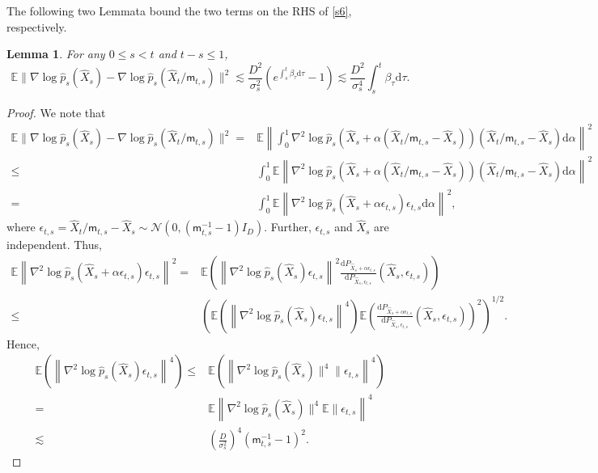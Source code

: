 \documentclass[12pts]{article}
\newtheorem{lemma}[defn]{Lemma}%
\newcommand{\diff}{\mathrm{d}}
\newcommand{\cN}{ \mathcal{N}}
\newcommand{\hX}{ \widehat{X}}
\newcommand{\E}{\mathbb{E}}
\newcommand{\hp}{\hat{p}}
\begin{document}
The following two Lemmata bound the two terms on the RHS of \eqref{s6}, respectively.
\begin{lemma}\label{lem:3}
    For any $0 \le s < t$ and $t-s \le 1$, \[\E \|\nabla \log \hp_s(\hX_s) - \nabla \log \hp_s(\hX_t/\mathsf{m}_{t,s})\|^2 \lesssim \frac{D^2}{\sigma_s^2} \left( e^{\int_s^t \beta_\tau \diff  \tau} - 1\right) \lesssim \frac{D^2}{\sigma_s^4} \int_s^t \beta_\tau \diff  \tau.\]
\end{lemma}
\begin{proof}
We note that 
\begingroup
\allowdisplaybreaks
\begin{align}
     \E \|\nabla \log \hp_s(\hX_s) - \nabla \log \hp_s(\hX_t/\mathsf{m}_{t,s})\|^2 = & \E \left\| \int_0^1 \nabla^2 \log \hp_s(\hX_s + \alpha (\hX_t/\mathsf{m}_{t,s} - \hX_s)) (\hX_t/\mathsf{m}_{t,s} - \hX_s) \diff  \alpha \right\|^2 \nonumber\\
    \le  & \int_0^1 \E \left\| \nabla^2 \log \hp_s(\hX_s + \alpha (\hX_t/\mathsf{m}_{t,s} - \hX_s)) (\hX_t/\mathsf{m}_{t,s} - \hX_s) \diff  \alpha \right\|^2 \nonumber\\
    = & \int_0^1 \E \left\| \nabla^2 \log \hp_s(\hX_s + \alpha \epsilon_{t,s}) \epsilon_{t,s} \diff  \alpha \right\|^2, \label{s5}
\end{align}
\endgroup
where $\epsilon_{t,s} = \hX_t/\mathsf{m}_{t,s} - \hX_s \sim \cN(0, (\mathsf{m}_{t,s}^{-1}-1)I_D)$. Further, $\epsilon_{t,s}$ and $\hX_s$ are independent. Thus,
\begin{align}
     \E \left\| \nabla^2 \log \hp_s(\hX_s + \alpha \epsilon_{t,s}) \epsilon_{t,s}  \right\|^2 
    = & \E \left(\left\| \nabla^2 \log \hp_s(\hX_s) \epsilon_{t,s} \right\|^2 \frac{\diff  P_{\hX_s + \alpha \epsilon_{t,s}}}{\diff  P_{\hX_s, \epsilon_{t,s}}}(\hX_s, \epsilon_{t,s}) \right) \nonumber\\
    \le & \left(\E \left(\left\| \nabla^2 \log \hp_s(\hX_s) \epsilon_{t,s} \right\|^4 \right) \E \left( \frac{\diff  P_{\hX_s + \alpha \epsilon_{t,s}}}{\diff  P_{\hX_s, \epsilon_{t,s}}}(\hX_s, \epsilon_{t,s}) \right)^2\right)^{1/2} . \label{s4}
\end{align}
Hence, 
\begin{align}
    \E \left(\left\| \nabla^2 \log \hp_s(\hX_s) \epsilon_{t,s} \right\|^4 \right) \le & \E \left(\left\| \nabla^2 \log \hp_s(\hX_s)\|^4 \|\epsilon_{t,s} \right\|^4 \right) \nonumber\\
    = & \E \left\| \nabla^2 \log \hp_s(\hX_s)\|^4 \E \|\epsilon_{t,s} \right\|^4 \nonumber\\
    \lesssim & \left(\frac{D}{\sigma_s^2}\right)^4 (\mathsf{m}_{t,s}^{-1}-1)^2 \label{s3}.

\end{align}
\end{proof}
\end{document}
